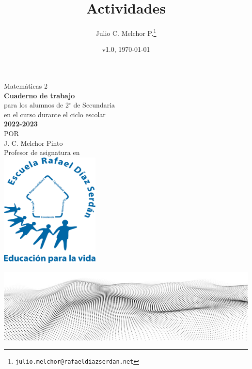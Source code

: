 \documentclass[]{book}
\title{Actividades}
\author{Julio C. Melchor P.\thanks{{\tt julio.melchor@rafaeldiazserdan.net}}}
\date{v1.0, \today}
\begin{document}
\pagestyle{empty}
\begin{center}
    {\Huge Matem\'aticas 2}\\
    \vspace{1cm}
    \normalsize
    \textbf{\large Cuaderno de trabajo}\\
    para los alumnos de 2$^\circ$ de  Secundaria\\
    en el curso durante el ciclo escolar\\
    \textbf{2022-2023}\\
    \vspace{2.2cm}
    \small POR\\
    \Large J. C. Melchor Pinto\\[0.5em]
    \normalsize Profesor de asignatura en\\
    \vspace{1cm}
    \includegraphics[width=5cm]{./Unidad 2/Images/LOGO_RDS_nobg}
\end{center}
\vspace{2.5cm}
%
\hspace{-16mm}
\includegraphics[width=\paperwidth]{./Unidad 2/Images/cover_bg}
\end{document}
